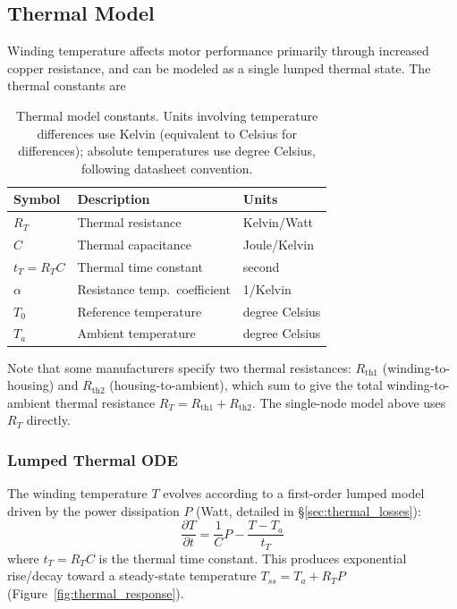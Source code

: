 \documentclass[10pt, a4paper, twocolumn]{article}
\begin{document}
\subsection{Thermal Model}
\label{sec:thermal}

Winding temperature affects motor performance primarily through increased copper resistance, and can be modeled as a single lumped thermal state. The thermal constants are

\begin{table}[H]
\centering
\footnotesize
\begin{tabular}{@{}lll@{}}
\toprule
Symbol & Description & Units \\
\midrule
$R_T$ & Thermal resistance & Kelvin/Watt \\
$C$ & Thermal capacitance & Joule/Kelvin \\
$t_T = R_T C$ & Thermal time constant & second \\
$\alpha$ & Resistance temp.\ coefficient & 1/Kelvin \\
$T_0$ & Reference temperature & degree Celsius \\
$T_a$ & Ambient temperature & degree Celsius \\
\bottomrule
\end{tabular}
\caption{Thermal model constants. Units involving temperature differences use Kelvin (equivalent to Celsius for differences); absolute temperatures use degree Celsius, following datasheet convention.}
\end{table}

\noindent Note that some manufacturers specify two thermal resistances: $R_{\text{th1}}$ (winding-to-housing) and $R_{\text{th2}}$ (housing-to-ambient), which sum to give the total winding-to-ambient thermal resistance $R_T = R_{\text{th1}} + R_{\text{th2}}$. The single-node model above uses $R_T$ directly.

\subsubsection{Lumped Thermal ODE}
\label{sec:thermal_ode}

The winding temperature $T$ evolves according to a first-order lumped model driven by the power dissipation $P$ (Watt, detailed in \S\ref{sec:thermal_losses}):
\begin{equation}
  \frac{\partial T}{\partial t} = \frac{1}{C} P - \frac{T - T_a}{t_T}
  \label{eq:thermal_ode}
\end{equation}
where $t_T = R_T C$ is the thermal time constant. This produces exponential rise/decay toward a steady-state temperature $T_{ss} = T_a + R_T P$ (Figure~\ref{fig:thermal_response}).
\end{document}

